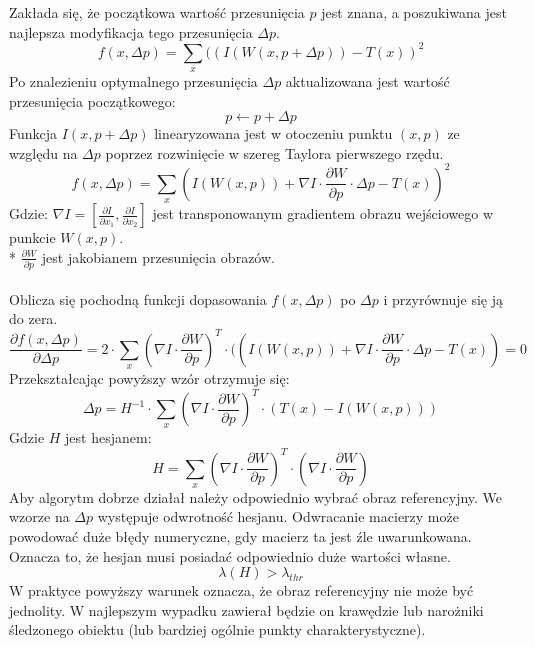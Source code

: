 Zakłada się, że początkowa wartość przesunięcia \(p\) jest znana, a poszukiwana jest najlepsza modyfikacja tego przesunięcia \(\Delta p\).
\begin{equation}
f(x,\Delta p)=\sum\limits_{x}((I(W(x,p+\Delta p))-T(x))^2
\end{equation}
Po znalezieniu optymalnego przesunięcia \(\Delta p\) aktualizowana jest wartość przesunięcia początkowego:
\begin{equation}
p \leftarrow p+\Delta p
\end{equation}
Funkcja \(I(x,p+\Delta p)\) linearyzowana jest w otoczeniu punktu \((x,p)\) ze względu na \(\Delta p\) poprzez rozwinięcie w szereg Taylora pierwszego rzędu.
\begin{equation}
f(x,\Delta p)=\sum\limits_{x}(I(W(x,p))+\nabla I \cdot \frac{\partial W}{\partial p} \cdot \Delta p-T(x))^2
\end{equation}
\noindent Gdzie:\newline
\(\nabla I=[\frac{\partial I}{\partial x_1}, \frac{\partial I}{\partial x_2}]\) jest transponowanym gradientem obrazu wejściowego w punkcie \(W(x,p)\).\\*
\(\frac{\partial W}{\partial p}\) jest jakobianem przesunięcia obrazów.
\paragraph*{}
Oblicza się pochodną funkcji dopasowania \(f(x,\Delta p)\) po \(\Delta p\) i przyrównuje się ją do zera.
\begin{equation}
\frac{\partial f(x,\Delta p)}{\partial \Delta p}=2 \cdot \sum\limits_{x} (\nabla I \cdot \frac{\partial W}{\partial p})^T \cdot ((I(W(x,p))+\nabla I \cdot \frac{\partial W}{\partial p} \cdot \Delta p-T(x))=0
\end{equation}
Przekształcając powyższy wzór otrzymuje się:
\begin{equation}
\label{eq:dp_klt}
\Delta p=H^{-1} \cdot \sum\limits_{x}(\nabla I \cdot \frac{\partial W}{\partial p})^T \cdot (T(x)-I(W(x,p)))
\end{equation}
\noindent Gdzie \(H\) jest hesjanem:
\begin{equation}
H=\sum\limits_{x}(\nabla I \cdot \frac{\partial W}{\partial p})^T \cdot (\nabla I \cdot \frac{\partial W}{\partial p})
\end{equation}
Aby algorytm dobrze działał należy odpowiednio wybrać obraz referencyjny. 
We wzorze na \(\Delta p\) występuje odwrotność hesjanu. Odwracanie macierzy może powodować duże błędy numeryczne, gdy macierz ta jest źle uwarunkowana. 
Oznacza to, że hesjan musi posiadać odpowiednio duże wartości własne.
\begin{equation}
\lambda(H)>\lambda_{thr}
\end{equation}
W praktyce powyższy warunek oznacza, że obraz referencyjny nie może być jednolity. 
W najlepszym wypadku zawierał będzie on krawędzie lub narożniki śledzonego obiektu (lub bardziej ogólnie punkty charakterystyczne).
